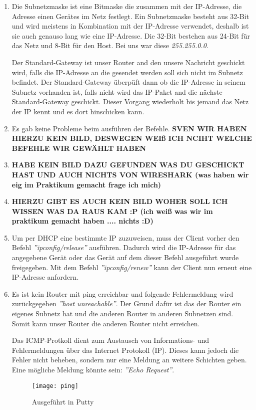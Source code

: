 \documentclass{scrartcl}
\begin{document}
   \renewcommand{\labelenumi}{\alph{enumi})}
   \begin{enumerate}
   \item
   Die Subnetzmaske ist eine Bitmaske die zusammen mit der IP-Adresse, die Adresse einen Gerätes im Netz festlegt. Ein Subnetzmaske besteht aus 32-Bit und wird meistens in Kombination mit der IP-Adresse verwendet, deshalb ist sie auch genauso lang wie eine IP-Adresse. Die 32-Bit bestehen aus 24-Bit für das Netz und 8-Bit für den Host. Bei uns war diese \textit{255.255.0.0}.
   
   Der Standard-Gateway ist unser Router and den unsere Nachricht geschickt wird, falls die IP-Adresse an die gesendet werden soll sich nicht im Subnetz befindet. Der Standard-Gateway überpüft dann ob die IP-Adresse in seinem Subnetz vorhanden ist, falls nicht wird das IP-Paket and die nächste Standard-Gateway geschickt. Dieser Vorgang wiederholt bis jemand das Netz der IP kennt und es dort hinschicken kann.

   \item
   Es gab keine Probleme beim ausführen der Befehle. 
   \textbf{SVEN WIR HABEN HIERZU KEIN BILD, DESWEGEN WEIß ICH NCIHT WELCHE BEFEHLE WIR GEWÄHLT HABEN}
   
   \item
   \textbf{HABE KEIN BILD DAZU GEFUNDEN WAS DU GESCHICKT HAST UND AUCH NICHTS VON WIRESHARK (was haben wir eig im Praktikum gemacht frage ich mich)}
   
   \item
   \textbf{HIERZU GIBT ES AUCH KEIN BILD WOHER SOLL ICH WISSEN WAS DA RAUS KAM :P (ich weiß was wir im praktikum gemacht haben .... nichts :D)}
   
   \item
   Um per DHCP eine bestimmte IP zuzuweisen, muss der Client vorher den Befehl \textit{''ipconfig/release''} ausführen. Dadurch wird die IP-Adresse für das angegebene Gerät oder das Gerät auf dem dieser Befehl ausgeführt wurde freigegeben. Mit dem Befehl \textit{''ipconfig/renew''} kann der Client nun erneut eine IP-Adresse anfordern.
   
   \item
   Es ist kein Router mit ping erreichbar und folgende Fehlermeldung wird zurückgegeben \textit{''host unreachable''}. Der Grund dafür ist das der Router ein eigenes Subnetz hat und die anderen Router in anderen Subnetzen sind. Somit kann unser Router die anderen Router nicht erreichen.
   
   Das ICMP-Protkoll dient zum Austausch von Informations- und Fehlermeldungen über das Internet Protokoll (IP). Dieses kann jedoch die Fehler nicht beheben, sondern nur eine Meldung an weitere Schichten geben. Eine mögliche Meldung könnte sein: \textit{''Echo Request''}.
   
   \begin{figure}[htbp]
   \centering
   \texttt{[image: ping]}
   \label{fig:ping}
	\caption{Ausgeführt in Putty}   
   \end{figure}
   \end{enumerate}
   
\end{document}
